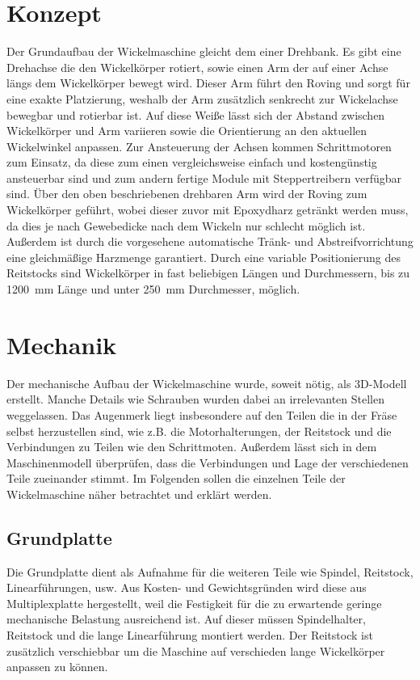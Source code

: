 \documentclass[paper=A4,pagesize,DIV=18, 12pt,listof=totoc,bibliography=totoc,headings=optiontohead,open=any]{article}
\begin{document}
\section{Konzept}
Der Grundaufbau der Wickelmaschine gleicht dem einer Drehbank. Es gibt eine Drehachse die den Wickelkörper rotiert, sowie einen Arm der auf einer Achse längs dem Wickelkörper bewegt wird. Dieser Arm führt den Roving und sorgt für eine exakte Platzierung, weshalb der Arm zusätzlich senkrecht zur Wickelachse bewegbar und rotierbar ist. Auf diese Weiße lässt sich der Abstand zwischen Wickelkörper und Arm variieren sowie die Orientierung an den aktuellen Wickelwinkel anpassen. Zur Ansteuerung der Achsen kommen Schrittmotoren zum Einsatz, da diese zum einen vergleichsweise einfach und kostengünstig ansteuerbar sind und zum andern fertige Module mit Steppertreibern verfügbar sind. Über den oben beschriebenen drehbaren Arm wird der Roving zum Wickelkörper geführt, wobei dieser zuvor mit Epoxydharz getränkt werden muss, da dies je nach Gewebedicke nach dem Wickeln nur schlecht möglich ist. Außerdem ist durch die vorgesehene automatische Tränk- und Abstreifvorrichtung eine gleichmäßige Harzmenge garantiert. Durch eine variable Positionierung des Reitstocks sind Wickelkörper in fast beliebigen Längen und Durchmessern, bis zu \SI{1200}{\milli\metre} Länge und unter \SI{250}{\milli\metre} Durchmesser, möglich.

\section{Mechanik}
Der mechanische Aufbau der Wickelmaschine wurde, soweit nötig, als 3D-Modell erstellt. Manche Details wie Schrauben wurden dabei an irrelevanten Stellen weggelassen. Das Augenmerk liegt insbesondere auf den Teilen die in der Fräse selbst herzustellen sind, wie z.B. die Motorhalterungen, der Reitstock und die Verbindungen zu Teilen wie den Schrittmoten. Außerdem lässt sich in dem Maschinenmodell überprüfen, dass die Verbindungen und Lage der verschiedenen Teile zueinander stimmt. Im Folgenden sollen die einzelnen Teile der Wickelmaschine näher betrachtet und erklärt werden.

\subsection{Grundplatte}
Die Grundplatte dient als Aufnahme für die weiteren Teile wie Spindel, Reitstock, Linearführungen, usw. Aus Kosten- und Gewichtsgründen wird diese aus Multiplexplatte hergestellt, weil die Festigkeit für die zu erwartende geringe mechanische Belastung ausreichend ist. Auf dieser müssen Spindelhalter, Reitstock und die lange Linearführung montiert werden. Der Reitstock ist zusätzlich verschiebbar um die Maschine auf verschieden lange Wickelkörper anpassen zu können.
\end{document}
